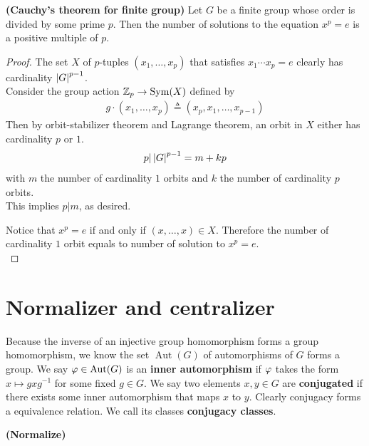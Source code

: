 \documentclass{report}
\begin{document}
\begin{theorem}
\textbf{(Cauchy's theorem for finite group)}  Let $G$ be a finite group whose order is divided by some prime $p$. Then the number of solutions to the equation $x^p =e$ is a positive multiple of  $p$.  
\end{theorem}
\begin{proof}
The set $X$ of $p$-tuples  $(x_1,\dots ,x_p)$ that satisfies $x_1\cdots x_p=e$ clearly has cardinality $\left|G\right|^{p-1}$. \\

Consider the group action $\mathbb{Z}_p \rightarrow \operatorname{Sym}(X)$ defined by 
\begin{align*}
g \cdot (x_1,\dots ,x_p) \triangleq (x_p,x_1,\dots ,x_{p-1}) 
\end{align*}
Then by orbit-stabilizer theorem and Lagrange theorem, an orbit in $X$ either has cardinality $p$ or  $1$. \\

\begin{align*}
p| \left|G\right|^{p-1}=m+kp
\end{align*}
with  $m$ the number of cardinality $1$ orbits and $k$ the number of cardinality  $p$ orbits.\\

This implies $p|m$, as desired.



Notice that $x^p=e$ if and only if  $(x,\dots ,x) \in X$. Therefore the number of cardinality $1$ orbit equals to number of solution to $x^p=e$.\\

\end{proof}


\section{Normalizer and centralizer}
Because the inverse of an injective group homomorphism forms a group homomorphism, we know the set $\operatorname{Aut}(G)$ of automorphisms of $G$ forms a group. We say $\pfi \in \operatorname{Aut}(G)$ is an \textbf{inner automorphism} if  $\pfi $ takes the form $x\mapsto  gxg^{-1}$ for some fixed $g \in G$. We say two elements  $x,y \in G$ are \textbf{conjugated} if there exists some inner automorphism that maps $x$ to $y$. Clearly conjugacy forms a equivalence relation. We call its classes \textbf{conjugacy classes}. 


\begin{equiv_def}
\textbf{(Normalize)}  
\end{equiv_def}
\end{document}
